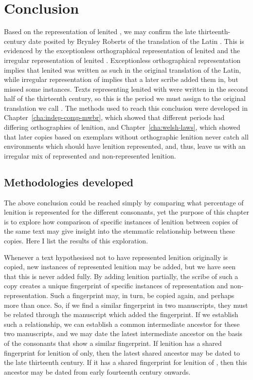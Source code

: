 \section{Conclusion}
\label{sec:dewi-conclusion}

Based on the representation of lenited , we may confirm the late thirteenth-century date  posited by Brynley Roberts of the translation of the Latin . This is evidenced by the exceptionless orthographical representation of lenited  and the irregular representation of lenited . Exceptionless orthographical representation implies that lenited  was written as such in the original translation of the Latin, while irregular representation of  implies that a later scribe added them in, but missed some instances. Texts representing lenited  with  were written in the second half of the thirteenth century, so this is the period we must assign to the original translation we call . The methods used to reach this conclusion were developed in Chapter~\ref{cha:indep-comp-mwbr}, which showed that different periods had differing orthographies of lenition, and Chapter~\ref{cha:welsh-laws}, which showed that later copies based on exemplars without orthographic lenition never  catch all environments which should have lenition represented, and, thus, leave us with an irregular mix of represented and non-represented lenition.

\subsection{Methodologies developed}
\label{sec:meth-devel}

The above conclusion could be reached simply by comparing what percentage of lenition is represented for the different consonants, yet the purpose of this chapter is to explore how comparison of specific instances of lenition between copies of the same text may give insight into the stemmatic relationship between these copies. Here I list the results of this exploration.

Whenever a text hypothesised not to have represented lenition originally is copied, new instances of represented lenition may be added, but we have seen that this is never added fully. By adding lenition partially, the scribe of such a copy creates a unique fingerprint of specific instances of representation and non-representation. Such a fingerprint may, in turn, be copied again, and perhaps more than once. So, if we find a similar fingerprint in two manuscripts, they must be related through the manuscript which added the fingerprint. If we establish such a relationship, we can establish a common intermediate ancestor for these two manuscripts, and we may date the latest intermediate ancestor on the basis of the consonants that show a similar fingerprint. If lenition has a shared fingerprint for lenition of  only, then the latest shared ancestor may be dated to the late thirteenth century. If it has a shared fingerprint for lenition of , then this ancestor may be dated from early fourteenth century onwards.

